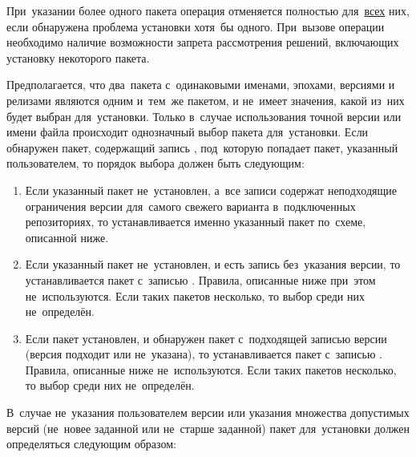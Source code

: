 При~указании более одного пакета операция отменяется полностью для~\underline{всех} них, 
если обнаружена проблема установки хотя~бы одного.
При~вызове операции необходимо наличие возможности запрета рассмотрения решений, 
включающих установку некоторого пакета. 

Предполагается, что два~пакета с~одинаковыми именами, эпохами, версиями и релизами являются одним и~тем~же пакетом,
и не~имеет значения, какой из~них будет выбран для~установки.
Только в~случае использования точной версии или имени файла происходит однозначный выбор пакета для~установки.
Если обнаружен пакет, содержащий запись , под~которую попадает пакет, указанный пользователем,
то порядок выбора должен быть следующим:

\begin{enumerate}

\item {
Если указанный пакет не~установлен, а~все записи  содержат неподходящие ограничения версии для~самого свежего варианта в~подключенных репозиториях,
то устанавливается именно указанный пакет по~схеме, описанной ниже.
}

\item {
Если указанный пакет не~установлен, и есть запись  без~указания версии,
то устанавливается пакет с~записью .
Правила, описанные ниже при~этом не~используются.
Если таких пакетов несколько, то выбор среди них не~определён.
}

\item {
Если пакет установлен, и обнаружен пакет с~подходящей записью версии (версия подходит или не~указана),
то устанавливается пакет с~записью .
Правила, описанные ниже не~используются.
Если таких пакетов несколько, то выбор среди них не~определён.
}

\end{enumerate}

В~случае не~указания пользователем версии или указания множества допустимых версий (не~новее заданной или не~старше заданной)
пакет для~установки должен определяться следующим образом:

